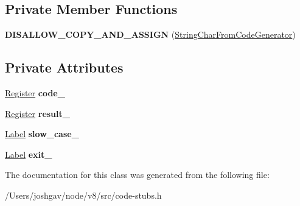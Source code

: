 \subsection*{Private Member Functions}
\begin{DoxyCompactItemize}
\item 
{\bfseries D\+I\+S\+A\+L\+L\+O\+W\+\_\+\+C\+O\+P\+Y\+\_\+\+A\+N\+D\+\_\+\+A\+S\+S\+I\+GN} (\hyperlink{classv8_1_1internal_1_1_string_char_from_code_generator}{String\+Char\+From\+Code\+Generator})\hypertarget{classv8_1_1internal_1_1_string_char_from_code_generator_a6e38aae35f3cddfa41e3ac7571dc0d2b}{}\label{classv8_1_1internal_1_1_string_char_from_code_generator_a6e38aae35f3cddfa41e3ac7571dc0d2b}

\end{DoxyCompactItemize}
\subsection*{Private Attributes}
\begin{DoxyCompactItemize}
\item 
\hyperlink{structv8_1_1internal_1_1_register}{Register} {\bfseries code\+\_\+}\hypertarget{classv8_1_1internal_1_1_string_char_from_code_generator_a0d49d7d5783d670cb10a344ce5e53b13}{}\label{classv8_1_1internal_1_1_string_char_from_code_generator_a0d49d7d5783d670cb10a344ce5e53b13}

\item 
\hyperlink{structv8_1_1internal_1_1_register}{Register} {\bfseries result\+\_\+}\hypertarget{classv8_1_1internal_1_1_string_char_from_code_generator_a560c17a59387374f4028dbc2ad56787b}{}\label{classv8_1_1internal_1_1_string_char_from_code_generator_a560c17a59387374f4028dbc2ad56787b}

\item 
\hyperlink{classv8_1_1internal_1_1_label}{Label} {\bfseries slow\+\_\+case\+\_\+}\hypertarget{classv8_1_1internal_1_1_string_char_from_code_generator_abf50db431f68818ea7ffbf3e855bed1a}{}\label{classv8_1_1internal_1_1_string_char_from_code_generator_abf50db431f68818ea7ffbf3e855bed1a}

\item 
\hyperlink{classv8_1_1internal_1_1_label}{Label} {\bfseries exit\+\_\+}\hypertarget{classv8_1_1internal_1_1_string_char_from_code_generator_acbe9a1940075f3f044a933b4f1dd886c}{}\label{classv8_1_1internal_1_1_string_char_from_code_generator_acbe9a1940075f3f044a933b4f1dd886c}

\end{DoxyCompactItemize}


The documentation for this class was generated from the following file\+:\begin{DoxyCompactItemize}
\item 
/\+Users/joshgav/node/v8/src/code-\/stubs.\+h\end{DoxyCompactItemize}
